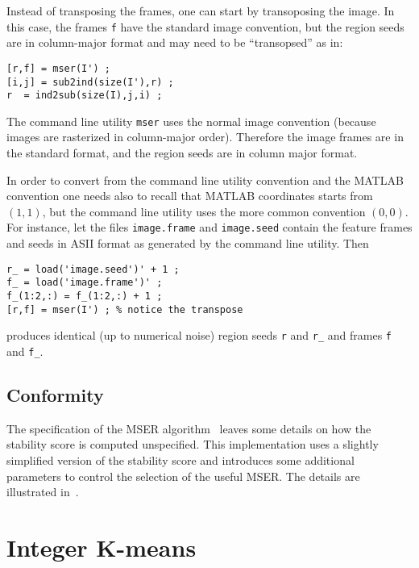 \documentclass[9pt]{article}
\newcommand{\cmd}  [1]{{\color{red}\tt   #1}}
\begin{document}
Instead of transposing the frames, one can start by transoposing the
image. In this case, the frames \verb$f$ have the standard image
convention, but the region seeds are in column-major format and may
need to be ``transopsed'' as in:
\begin{verbatim}
[r,f] = mser(I') ;
[i,j] = sub2ind(size(I'),r) ;
r  = ind2sub(size(I),j,i) ; 
\end{verbatim}

The command line utility \cmd{mser} uses the normal image convention
(because images are rasterized in column-major order). Therefore the
image frames are in the standard format, and the region seeds are in
column major format.

In order to convert from the command line utility convention and the
MATLAB convention one needs also to recall that MATLAB coordinates 
starts from $(1,1)$, but the command line utility uses the more common
convention $(0,0)$. For instance, let the files \verb$image.frame$ and
\verb$image.seed$ contain the feature frames and seeds in ASII format
as generated by the command line utility. Then 
\begin{verbatim}
r_ = load('image.seed')' + 1 ;
f_ = load('image.frame')' ; 
f_(1:2,:) = f_(1:2,:) + 1 ;
[r,f] = mser(I') ; % notice the transpose
\end{verbatim}
produces identical (up to numerical noise) region seeds \verb$r$ and
\verb$r_$ and frames \verb$f$ and \verb$f_$.

\subsection{Conformity}\label{mser.conformity}

The specification of the MSER algorithm~\cite{matas03robust} leaves
some details on how the stability score is computed unspecified. This
implementation uses a slightly simplified version of the stability
score and introduces some additional parameters to control the
selection of the useful MSER. The details are illustrated
in~\cite{vedaldi07vlfeat-dox}.

\section{Integer K-means}\label{ikmeans}
\end{document}
